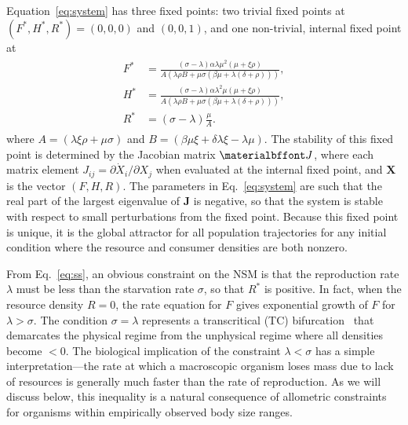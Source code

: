 \documentclass{pnastwo}
\begin{document}
\begin{article}
Equation~\eqref{eq:system} has three fixed points: two trivial fixed points at $(F^*,H^*,R^*)=(0,0,0)$ and $(0,0,1)$, and one non-trivial, internal fixed point at
\begin{align}
\label{eq:ss}
\begin{split}
F^* &= \frac{(\sigma-\lambda) \alpha  \lambda  \mu ^2  (\mu +\xi  \rho )}{A (\lambda  \rho  B+\mu  \sigma  (\beta  \mu +\lambda  (\delta +\rho )))}, \\
H^* &= \frac{(\sigma-\lambda) \alpha  \lambda ^2 \mu  (\mu +\xi  \rho )}{A (\lambda  \rho  B+\mu  \sigma  (\beta  \mu +\lambda  (\delta +\rho )))}, \\
R^* &= (\sigma - \lambda)\frac{\mu  }{A}.
\end{split}
\end{align}
where $A=(\lambda  \xi  \rho +\mu  \sigma )$ and $B=(\beta  \mu  \xi +\delta  \lambda  \xi -\lambda  \mu )$. The stability of this fixed point is determined by the Jacobian matrix $\bf J$, where each matrix element $J_{ij}=\partial{\dot X_i}/\partial{X_j}$ when evaluated at the internal fixed point, and $\mathbf{X}$ is the vector $(F,H,R)$.
The parameters in Eq.~\eqref{eq:system} are such that the real part of the largest eigenvalue of $\mathbf{J}$ is negative, so that the system is stable with respect to small perturbations from the fixed point.
Because this fixed point is unique, it is the global attractor for all population trajectories for any initial condition where the resource and consumer densities are both nonzero.

From Eq.~\eqref{eq:ss}, an obvious constraint on the NSM is that the reproduction rate $\lambda$ must be less than the starvation rate $\sigma$, so that $R^*$ is positive.  In fact, when the resource density $R=0$, the rate equation for $F$ gives exponential growth of $F$ for $\lambda>\sigma$.
The condition $\sigma = \lambda$ represents a transcritical (TC) bifurcation~\cite{Strogatz:2008wo} that demarcates the physical regime from the unphysical regime where all densities become $<0$.
The biological implication of the constraint $\lambda<\sigma$ has a simple interpretation---the rate at which a macroscopic organism loses mass due to lack of resources is generally much faster than the rate of reproduction.
As we will discuss below, this inequality is a natural consequence of allometric constraints~\cite{Kempes:2012hy} for organisms within empirically observed body size ranges. %


\end{article}
\end{document}
